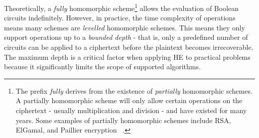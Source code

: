 Theoretically, a \textit{fully} homomorphic scheme\footnote{The prefix \textit{fully} derives from the existence of \textit{partially} homomorphic schemes. A partially homomorphic scheme will only allow certain operations on the ciphertext - usually multiplication and division - and have existed for many years. Some examples of partially homomorphic schemes include RSA, ElGamal, and Paillier encryption ~\cite{PartialSchemes}.} allows the evaluation of Boolean circuits indefinitely. However, in practice, the time complexity of operations means many schemes are \textit{levelled} homomorphic schemes. This means they only support operations up to a \textit{bounded depth} - that is, only a predefined number of circuits can be applied to a ciphertext before the plaintext becomes irrecoverable. The maximum depth is a critical factor when applying HE to practical problems because it significantly limits the scope of supported algorithms.

\setlength{\leftskip}{0cm}
